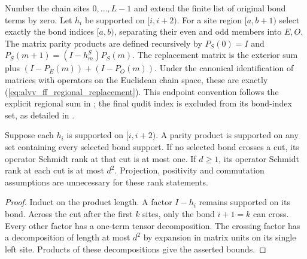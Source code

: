 \begin{definition}
    \label{def:alvv_ff_matrix_replacement}
    \leanok
    Number the chain sites $0,\ldots,L-1$ and extend the finite list
    of original bond terms by zero. Let $h_i$ be supported on
    $\lbrack i,i+2)$. For a site region $\lbrack a,b+1)$ select exactly the bond indices
    $\lbrack a,b)$, separating their even and odd members into $E,O$.
    The matrix parity products are defined recursively by $P_S(0)=I$ and
    $P_S(m+1)=(I-h_m^S)P_S(m)$. The replacement matrix is the exterior
    sum plus $(I-P_E(m))+(I-P_O(m))$.
    Under the canonical identification of matrices with operators on the
    Euclidean chain space, these are exactly
    (\ref{eq:alvv_ff_regional_replacement}).
    This endpoint convention follows the explicit regional sum in
    \cite[Definition~5.10]{Arad2016RigorousRG}; the final qudit index is
    excluded from its bond-index set, as detailed in
    \cite{gap:alvv16_ff_rank}.
\end{definition}

\begin{lemma}
    \label{lem:alvv_ff_matrix_product_rank}
    \leanok
    Suppose each $h_i$ is supported on $\lbrack i,i+2)$.
    A parity product is supported on any set containing every selected
    bond support. If no selected bond crosses a cut, its operator Schmidt
    rank at that cut is at most one. If $d\ge1$, its operator Schmidt rank
    at each cut is at most $d^2$.
    Projection, positivity and commutation assumptions are unnecessary
    for these rank statements.
\end{lemma}
\begin{proof}\leanok
    Induct on the product length. A factor $I-h_i$ remains supported on
    its bond. Across the cut after the first $k$ sites, only the bond
    $i+1=k$ can cross. Every other factor has a one-term tensor
    decomposition. The crossing factor has a decomposition of length
    at most $d^2$ by expansion in matrix units on its single left site.
    Products of these decompositions give the asserted bounds.
\end{proof}

